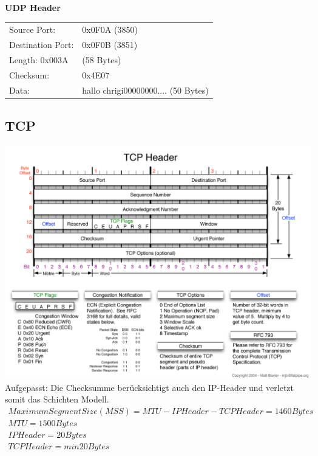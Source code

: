 \textbf{UDP Header}\\
\begin{tabular}[h]{ll}
Source Port: & 0x0F0A (3850)\\
Destination Port: & 0x0F0B (3851)\\
Length: 0x003A & (58 Bytes)\\
Checksum: & 0x4E07\\
Data: & hallo chrigi00000000.... (50 Bytes)
\end{tabular}


\subsection{TCP}
\includegraphics[scale=0.8]{media/TCPHeader.png}
Aufgepasst: Die Checksumme berücksichtigt auch den IP-Header und verletzt somit das Schichten Modell. \\
\begin{align*}
Maximum Segment Size (MSS) = MTU - IPHeader - TCP Header = 1460 Bytes\\
MTU = 1500Bytes\\
IPHeader = 20 Bytes\\
TCPHeader = min 20Bytes
\end{align*}
